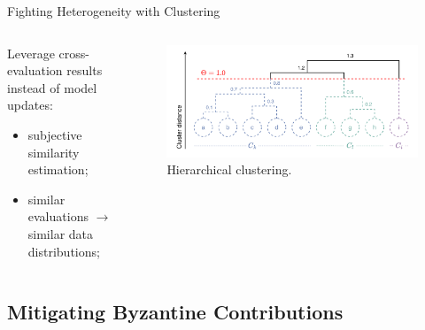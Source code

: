 \begin{frame}{Fighting Heterogeneity with Clustering}
    \begin{columns}
        \begin{column}{.4\textwidth}

        Leverage cross-evaluation results instead of model updates:
        \begin{itemize}
            \item subjective similarity estimation;
            \item similar evaluations $\rightarrow$ similar data distributions;
        \end{itemize}

        \end{column}
        \begin{column}{.6\textwidth}
            \begin{figure}
                \centering
                \includegraphics[width=\textwidth]{figures/radar/clustering.drawio.pdf}
                \caption{Hierarchical clustering.}
            \end{figure}
        \end{column}
    \end{columns}
\end{frame}



\subsection{Mitigating Byzantine Contributions}

\begin{frame}
  \subsectionpage
\end{frame}

